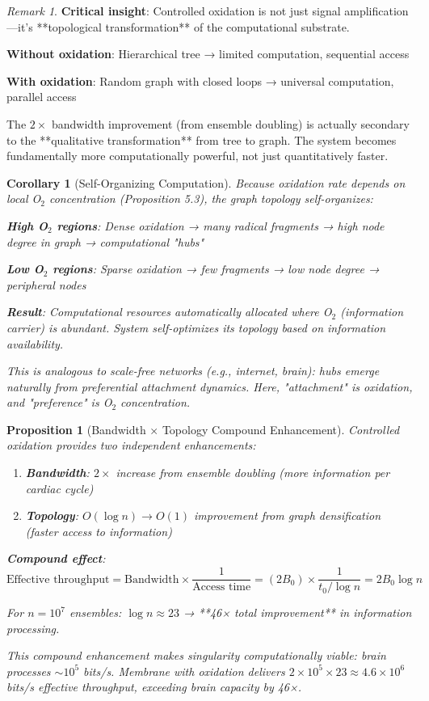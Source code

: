 \documentclass[11pt,a4paper]{article}
\newtheorem{proposition}[theorem]{Proposition}
\newtheorem{corollary}[theorem]{Corollary}
\theoremstyle{definition}
\theoremstyle{remark}
\newtheorem{remark}[theorem]{Remark}
\begin{document}
\begin{remark}
\textbf{Critical insight}: Controlled oxidation is not just signal amplification—it's **topological transformation** of the computational substrate.

\textbf{Without oxidation}: Hierarchical tree → limited computation, sequential access

\textbf{With oxidation}: Random graph with closed loops → universal computation, parallel access

The $2\times$ bandwidth improvement (from ensemble doubling) is actually secondary to the **qualitative transformation** from tree to graph. The system becomes fundamentally more computationally powerful, not just quantitatively faster.
\end{remark}

\begin{corollary}[Self-Organizing Computation]
Because oxidation rate depends on local O$_2$ concentration (Proposition 5.3), the graph topology self-organizes:

\textbf{High O$_2$ regions}: Dense oxidation → many radical fragments → high node degree in graph → computational "hubs"

\textbf{Low O$_2$ regions}: Sparse oxidation → few fragments → low node degree → peripheral nodes

\textbf{Result}: Computational resources automatically allocated where O$_2$ (information carrier) is abundant. System self-optimizes its topology based on information availability.

This is analogous to scale-free networks (e.g., internet, brain): hubs emerge naturally from preferential attachment dynamics. Here, "attachment" is oxidation, and "preference" is O$_2$ concentration.
\end{corollary}

\begin{proposition}[Bandwidth × Topology Compound Enhancement]
Controlled oxidation provides two independent enhancements:

\begin{enumerate}
\item \textbf{Bandwidth}: $2\times$ increase from ensemble doubling (more information per cardiac cycle)
\item \textbf{Topology}: $O(\log n) \to O(1)$ improvement from graph densification (faster access to information)
\end{enumerate}

\textbf{Compound effect}:
\begin{equation}
\text{Effective throughput} = \text{Bandwidth} \times \frac{1}{\text{Access time}} = (2B_0) \times \frac{1}{t_0 / \log n} = 2B_0 \log n
\end{equation}

For $n = 10^7$ ensembles: $\log n \approx 23$ → **46× total improvement** in information processing.

This compound enhancement makes singularity computationally viable: brain processes $\sim 10^5$ bits/s. Membrane with oxidation delivers $2 \times 10^5 \times 23 \approx 4.6 \times 10^6$ bits/s effective throughput, exceeding brain capacity by 46×.
\end{proposition}
\end{document}
